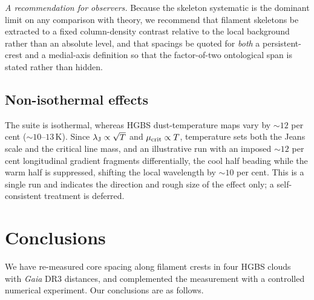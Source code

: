 \documentclass[usenatbib,twoside,twocolumn]{mnras}
\begin{document}
\smallskip\noindent\emph{A recommendation for observers.} Because the skeleton systematic is the dominant limit on any comparison with theory, we recommend that filament skeletons be extracted to a fixed column-density contrast relative to the local background rather than an absolute level, and that spacings be quoted for \emph{both} a persistent-crest and a medial-axis definition so that the factor-of-two ontological span is stated rather than hidden.



\subsection{Non-isothermal effects}
\label{sec:mt_variation}

The suite is isothermal, whereas HGBS dust-temperature maps vary by $\sim12$ per cent ($\sim10$--$13$\,K). Since $\lambda_{\rm J}\propto\sqrt{T}$ and $\mu_{\rm crit}\propto T$, temperature sets both the Jeans scale and the critical line mass, and an illustrative run with an imposed $\sim12$ per cent longitudinal gradient fragments differentially, the cool half beading while the warm half is suppressed, shifting the local wavelength by $\sim10$ per cent. This is a single run and indicates the direction and rough size of the effect only; a self-consistent treatment is deferred.



\section{Conclusions}

We have re-measured core spacing along filament crests in four HGBS clouds with \textit{Gaia} DR3 distances, and complemented the measurement with a controlled numerical experiment. Our conclusions are as follows.
\end{document}
